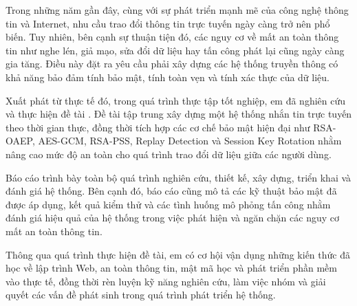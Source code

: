 
Trong những năm gần đây, cùng với sự phát triển mạnh mẽ của công nghệ thông tin và Internet, nhu cầu trao đổi thông tin trực tuyến ngày càng trở nên phổ biến. Tuy nhiên, bên cạnh sự thuận tiện đó, các nguy cơ về mất an toàn thông tin như nghe lén, giả mạo, sửa đổi dữ liệu hay tấn công phát lại cũng ngày càng gia tăng. Điều này đặt ra yêu cầu phải xây dựng các hệ thống truyền thông có khả năng bảo đảm tính bảo mật, tính toàn vẹn và tính xác thực của dữ liệu.

Xuất phát từ thực tế đó, trong quá trình thực tập tốt nghiệp, em đã nghiên cứu và thực hiện đề tài \textbf{\TenBaoCao}. Đề tài tập trung xây dựng một hệ thống nhắn tin trực tuyến theo thời gian thực, đồng thời tích hợp các cơ chế bảo mật hiện đại như RSA-OAEP, AES-GCM, RSA-PSS, Replay Detection và Session Key Rotation nhằm nâng cao mức độ an toàn cho quá trình trao đổi dữ liệu giữa các người dùng.

Báo cáo trình bày toàn bộ quá trình nghiên cứu, thiết kế, xây dựng, triển khai và đánh giá hệ thống. Bên cạnh đó, báo cáo cũng mô tả các kỹ thuật bảo mật đã được áp dụng, kết quả kiểm thử và các tình huống mô phỏng tấn công nhằm đánh giá hiệu quả của hệ thống trong việc phát hiện và ngăn chặn các nguy cơ mất an toàn thông tin.

Thông qua quá trình thực hiện đề tài, em có cơ hội vận dụng những kiến thức đã học về lập trình Web, an toàn thông tin, mật mã học và phát triển phần mềm vào thực tế, đồng thời rèn luyện kỹ năng nghiên cứu, làm việc nhóm và giải quyết các vấn đề phát sinh trong quá trình phát triển hệ thống.